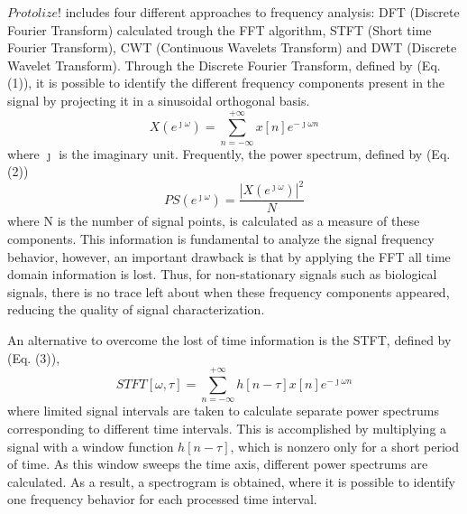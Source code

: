 \documentclass[12pt, a4paper]{article}
\begin{document}
$Protolize!$ includes four different approaches to frequency analysis: DFT (Discrete Fourier Transform) calculated trough the FFT algorithm, STFT (Short time Fourier Transform), CWT (Continuous Wavelets Transform) and DWT (Discrete Wavelet Transform).
Through the Discrete Fourier Transform, defined by (Eq. (1)), it is possible to identify the different frequency components present in the signal by projecting it in a sinusoidal orthogonal basis.
\begin{equation}
X(e^{\jmath \omega}) = \sum\limits_{n = -\infty}^{+\infty} x[n] e^{- \jmath \omega n}
\end{equation}
where $\jmath$ is the imaginary unit. Frequently, the power spectrum, defined by (Eq. (2))
\begin{equation}
PS(e^{\jmath \omega}) = \frac{|X(e^{\jmath \omega})|^2}{N}
\end{equation}
where N is the number of signal points, is calculated as a measure of these components. This information is fundamental to analyze the signal frequency behavior, however, an important drawback is that by applying the FFT all time domain information is lost. Thus, for non-stationary signals such as biological signals, there is no trace left about when these frequency components appeared, reducing the quality of signal characterization.

An alternative to overcome the lost of time information is the STFT, defined by (Eq. (3)),
\begin{equation}
STFT[\omega, \tau] = \sum\limits_{n = -\infty}^{+\infty} h[n - \tau] x[n] e^{- \jmath \omega n}
\end{equation}
where limited signal intervals are taken to calculate separate power spectrums corresponding to different time intervals. This is accomplished by multiplying a signal with a window function $h[n-\tau]$, which is nonzero only for a short period of time. As this window sweeps the time axis, different power spectrums are calculated. As a result, a spectrogram is obtained, where it is possible to identify one frequency behavior for each processed time interval.
\end{document}
